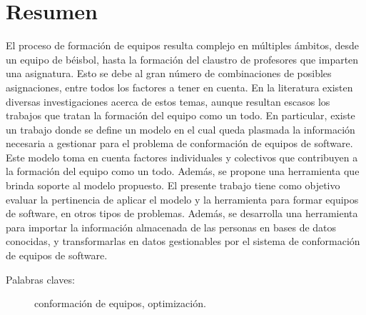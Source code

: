 \section*{Resumen}
El proceso de formación de equipos resulta complejo en múltiples ámbitos, desde un equipo de béisbol, hasta la formación del claustro de profesores que imparten una asignatura. Esto se debe al gran número de combinaciones de posibles asignaciones, entre todos los factores a tener en cuenta. En la literatura existen diversas investigaciones acerca de estos temas, aunque resultan escasos los trabajos que tratan la formación del equipo como un todo. En particular, existe un trabajo donde se define un modelo en el cual queda plasmada la información necesaria a gestionar para el problema de conformación de equipos de software. Este modelo toma en cuenta factores individuales y colectivos que contribuyen a la formación del equipo como un todo. Además, se propone una herramienta que brinda soporte al modelo propuesto. El presente trabajo tiene como objetivo evaluar la pertinencia de aplicar el modelo y la herramienta para formar equipos de software, en otros tipos de problemas. Además, se desarrolla una herramienta para importar la información almacenada de las personas en bases de datos conocidas, y transformarlas en datos gestionables por el sistema de conformación de equipos de software.

\begin{description}
	\item[Palabras claves:]{conformación de equipos, optimización.}
\end{description}


